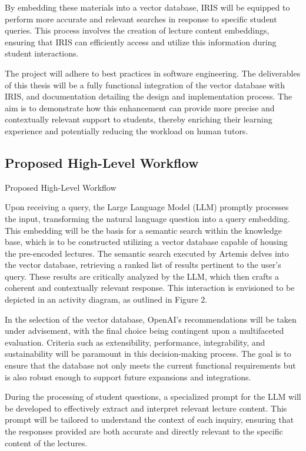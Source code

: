 \documentclass[a4paper,12pt,twoside]{article}
\begin{document}
By embedding these materials into a vector database, IRIS will be equipped to perform more accurate and relevant searches in response to specific student queries. This process involves the creation of lecture content embeddings, ensuring that IRIS can efficiently access and utilize this information during student interactions. 

The project will adhere to best practices in software engineering. The deliverables of this thesis will be a fully functional integration of the vector database with IRIS, and documentation detailing the design and implementation process. The aim is to demonstrate how this enhancement can provide more precise and contextually relevant support to students, thereby enriching their learning experience and potentially reducing the workload on human tutors. 

\subsection{Proposed High-Level Workflow}
Proposed High-Level Workflow

Upon receiving a query, the Large Language Model (LLM) promptly processes the input, transforming the natural language question into a query embedding. This embedding will be the basis for a semantic search within the knowledge base, which is to be constructed utilizing a vector database capable of housing the pre-encoded lectures.
The semantic search executed by Artemis delves into the vector database, retrieving a ranked list of results pertinent to the user's query. These results are critically analyzed by the LLM, which then crafts a coherent and contextually relevant response.\cite{6} This interaction is envisioned to be depicted in an activity diagram, as outlined in Figure 2.

In the selection of the vector database, OpenAI's recommendations will be taken under advisement, with the final choice being contingent upon a multifaceted evaluation. Criteria such as extensibility, performance, integrability, and sustainability will be paramount in this decision-making process. The goal is to ensure that the database not only meets the current functional requirements but is also robust enough to support future expansions and integrations.

During the processing of student questions, a specialized prompt for the LLM will be developed to effectively extract and interpret relevant lecture content. This prompt will be tailored to understand the context of each inquiry, ensuring that the responses provided are both accurate and directly relevant to the specific content of the lectures.
\end{document}
